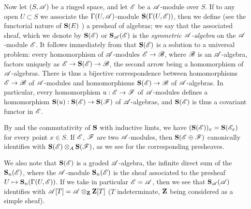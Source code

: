 \begin{env}[1.7.4]
\label{II.1.7.4}
Now let $(S,\mathscr{A})$ be a ringed space, and let $\mathscr{E}$ be a $\mathscr{A}$-module over $S$.
If to any open $U\subset S$ we associate the $\Gamma(U,\mathscr{A})$-module $\mathbf{S}(\Gamma(U,\mathscr{E}))$, then we define (see the functorial nature of $\mathbf{S}(E)$ ) a presheaf of algebras; we say that the associated sheaf, which we denote by $\mathbf{S}(\mathscr{E})$ or $\mathbf{S}_\mathscr{A}(\mathscr{E})$ is the \emph{symmetric $\mathscr{A}$-algebra} on the $\mathscr{A}$-module $\mathscr{E}$.
It follows immediately from  that $\mathbf{S}(\mathscr{E})$ is a solution to a universal problem: every homomorphism of $\mathscr{A}$-modules $\sh{E}\to\sh{B}$, where $\mathscr{B}$ is an $\mathscr{A}$-algebra, factors uniquely as $\sh{E}\to\bb{S}(\sh{E})\to\sh{B}$, the second arrow being a homomorphism of $\mathscr{A}$-algebras.
There is thus a bijective correspondence between homomorphisms $\sh{E}\to\sh{B}$ of $\mathscr{A}$-modules and homomorphisms $\bb{S}(\sh{E})\to\sh{B}$ of $\mathscr{A}$-algebras.
In particular, every homomorphism $u:\sh{E}\to\sh{F}$ of $\mathscr{A}$-modules defines a homomorphism $\bb{S}(u):\bb{S}(\sh{E})\to\bb{S}(\sh{F})$ of $\mathscr{A}$-algebras, and $\mathbf{S}(\mathscr{E})$ is thus a covariant functor in $\mathscr{E}$.

By  and the commutativity of $\mathbf{S}$ with inductive limts, we have $(\mathbf{S}(\mathscr{E}))_x=\mathbf{S}(\mathscr{E}_x)$ for every point $x\in S$.
If $\mathscr{E}$, $\mathscr{F}$ are two $\mathscr{A}$-modules, then $\mathbf{S}(\mathscr{E}\oplus\mathscr{F})$ canonically identifies with $\mathbf{S}(\mathscr{E})\otimes_A\mathbf{S}(\mathscr{F})$, as we see for the corresponding presheaves.

We also note that $\mathbf{S}(\mathscr{E})$ is a graded $\mathscr{A}$-algebra, the infinite direct sum of the $\mathbf{S}_n(\mathscr{E})$, where the $\mathscr{A}$-module $\mathbf{S}_n(\mathscr{E})$ is the sheaf associated to the presheaf $U\mapsto\bb{S}_n(\Gamma(U,\sh{E}))$.
If we take in particular $\mathscr{E}=\mathscr{A}$, then we see that $\mathbf{S}_\mathscr{A}(\mathscr{A})$ identifies with $\mathscr{A}[T]=\mathscr{A}\otimes_\mathbf{Z}\mathbf{Z}[T]$ ($T$ indeterminate, $\mathbf{Z}$ being considered as a simple sheaf).
\end{env}


